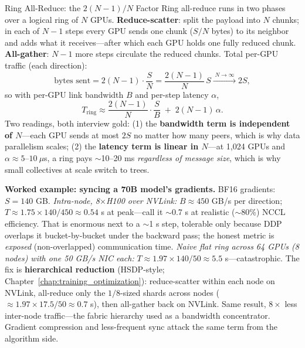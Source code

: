 \begin{mathresult}{Ring All-Reduce: the $2(N-1)/N$ Factor}
Ring all-reduce runs in two phases over a logical ring of $N$ GPUs. \textbf{Reduce-scatter}: split the payload into $N$ chunks; in each of $N-1$ steps every GPU sends one chunk ($S/N$ bytes) to its neighbor and adds what it receives---after which each GPU holds one fully reduced chunk. \textbf{All-gather}: $N-1$ more steps circulate the reduced chunks. Total per-GPU traffic (each direction):
\begin{equation}
\text{bytes sent} = 2(N-1)\cdot\frac{S}{N} = \frac{2(N-1)}{N}\,S \xrightarrow{\;N \to \infty\;} 2S,
\end{equation}
so with per-GPU link bandwidth $B$ and per-step latency $\alpha$,
\begin{equation}
T_{\text{ring}} \approx \frac{2(N-1)}{N}\cdot\frac{S}{B} \;+\; 2(N-1)\,\alpha.
\end{equation}
Two readings, both interview gold: (1) the \textbf{bandwidth term is independent of $N$}---each GPU sends at most $2S$ no matter how many peers, which is why data parallelism scales; (2) the \textbf{latency term is linear in $N$}---at 1{,}024 GPUs and $\alpha \approx 5$--$10\ \mu$s, a ring pays $\sim$10--20 ms \textit{regardless of message size}, which is why small collectives at scale switch to trees.
\end{mathresult}

\textbf{Worked example: syncing a 70B model's gradients.} BF16 gradients: $S = 140$ GB. \textit{Intra-node, 8$\times$H100 over NVLink:} $B \approx 450$ GB/s per direction; $T \approx 1.75 \times 140/450 \approx 0.54$ s at peak---call it $\sim$0.7 s at realistic ($\sim$80\%) NCCL efficiency. That is enormous next to a $\sim$1 s step, tolerable only because DDP overlaps it bucket-by-bucket under the backward pass; the honest metric is \textit{exposed} (non-overlapped) communication time. \textit{Naive flat ring across 64 GPUs (8 nodes) with one 50 GB/s NIC each:} $T \approx 1.97 \times 140/50 \approx 5.5$ s---catastrophic. The fix is \textbf{hierarchical reduction} (HSDP-style; Chapter~\ref{chap:training_optimization}): reduce-scatter within each node on NVLink, all-reduce only the $1/8$-sized shards across nodes ($\approx 1.97 \times 17.5/50 \approx 0.7$ s), then all-gather back on NVLink. Same result, $8\times$ less inter-node traffic---the fabric hierarchy used as a bandwidth concentrator. Gradient compression and less-frequent sync attack the same term from the algorithm side.

